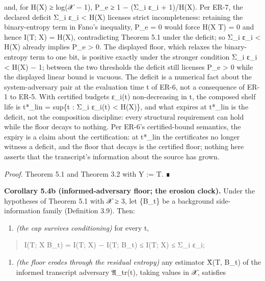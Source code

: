 \documentclass[
  11pt,
]{article}
\providecommand{\tightlist}{%
  \setlength{\itemsep}{0pt}\setlength{\parskip}{0pt}}
\begin{document}
and, for H(X) ≥ log(\textbar 𝒳\textbar{} − 1), P\_e ≥ 1 − (Σ\_i ε\_i +
1)/H(X). Per ER-7, the declared deficit Σ\_i ε\_i \textless{} H(X)
licenses strict incompleteness: retaining the binary-entropy term in
Fano's inequality, P\_e = 0 would force H(X \textbar{} T) = 0 and hence
I(T; X) = H(X), contradicting Theorem 5.1 under the deficit; so Σ\_i
ε\_i \textless{} H(X) already implies P\_e \textgreater{} 0. The
displayed floor, which relaxes the binary-entropy term to one bit, is
positive exactly under the stronger condition Σ\_i ε\_i \textless{} H(X)
− 1; between the two thresholds the deficit still licenses P\_e
\textgreater{} 0 while the displayed linear bound is vacuous. The
deficit is a numerical fact about the system-adversary pair at the
evaluation time t of ER-6, not a consequence of ER-1 to ER-5. With
certified budgets ε\_i(t) non-decreasing in t, the composed shelf life
is t*\_lin = sup\{t : Σ\_i ε\_i(t) \textless{} H(X)\}, and what expires
at t*\_lin is the deficit, not the composition discipline: every
structural requirement can hold while the floor decays to nothing. Per
ER-6's certified-bound semantics, the expiry is a claim about the
certification: at t*\_lin the certificates no longer witness a deficit,
and the floor that decays is the certified floor; nothing here asserts
that the transcript's information about the source has grown.

\emph{Proof.} Theorem 5.1 and Theorem 3.2 with Y := T. ∎

\textbf{Corollary 5.4b (informed-adversary floor; the erosion clock).}
Under the hypotheses of Theorem 5.1 with \textbar 𝒳\textbar{} ≥ 3, let
\{B\_t\} be a background side-information family (Definition 3.9). Then:

\begin{enumerate}
\def\labelenumi{(\roman{enumi})}
\tightlist
\item
  \emph{(the cap survives conditioning)} for every t,
\end{enumerate}

\begin{quote}
I(T; X \textbar{} B\_t) = I(T; X) − I(T; B\_t) ≤ I(T; X) ≤ Σ\_i ε\_i;
\end{quote}

\begin{enumerate}
\def\labelenumi{(\roman{enumi})}
\setcounter{enumi}{1}
\tightlist
\item
  \emph{(the floor erodes through the residual entropy)} any estimator
  X̂(T, B\_t) of the informed transcript adversary 𝔄\_tr(t), taking
  values in 𝒳, satisfies
\end{enumerate}
\end{document}
